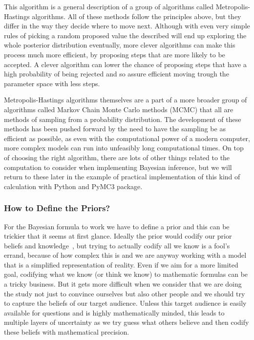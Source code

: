 \documentclass[12pt,a4paper,leqno]{report}
\theoremstyle{plain}
\theoremstyle{definition}
\theoremstyle{remark}
\begin{document}
This algorithm is a general description of a group of algorithms called
Metropolis-Hastings algorithms. All of these methods follow the principles
above, but they differ in the way they decide where to move next. Although with
even very simple rules of picking a random proposed value the described will end
up exploring the whole posterior distribution eventually, more clever algorithms
can make this process much more efficient, by proposing steps that are more
likely to be accepted. A clever algorithm can lower the chance of
proposing steps that have a high probability of being rejected and so assure
efficient moving trough the parameter space with less steps.

Metropolis-Hastings algorithms themselves are a part of a more broader group of
algorithms called Markov Chain Monte Carlo methods (MCMC) that all are methods of
sampling from a probability distribution. The development of these methods has
been pushed forward by the need to have the sampling be as efficient as
possible, as even with the computational power of a modern computer, more complex
models can run into unfeasibly long computational times. On top of choosing the
right algorithm, there are lots of other things related to the computation to
consider when implementing Bayesian inference, but we will return to these later
in the example of practical implementation of this kind of calculation with
Python and PyMC3 package.

\subsubsection{How to Define the Priors?}\label{bayesproblems}

For the Bayesian formula to work we have to define a prior and this can be
trickier that it seems at first glance. Ideally the prior would codify our prior
beliefs and knowledge\ \cite{gelman, kruschke}, but trying to actually codify all we
know is a fool's errand, because of how complex this is and we are
anyway working with a model that is a simplified representation of reality. Even if
we aim for a more limited goal, codifying what we know (or think we know)
to mathematic formulas can be a tricky business. But it gets more
difficult when we consider that we are doing the study not just to convince ourselves
but also other people and we should try to capture the beliefs of our target audience.
Unless this target audience is easily available for questions and is highly mathematically minded,
this leads to multiple layers of uncertainty as we try guess what others
believe and then codify these beliefs with mathematical precision.
\end{document}
